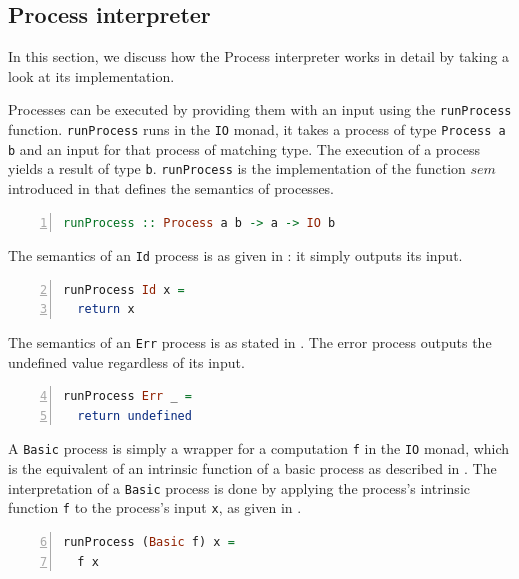\subsection{Process interpreter}
In this section, we discuss how the Process interpreter works in detail by taking a look at its implementation.

Processes can be executed by providing them with an input using the \texttt{runProcess} function. \texttt{runProcess} runs in the \texttt{IO} monad, it takes a process of type \texttt{Process a b} and an input for that process of matching type. The execution of a process yields a result of type \texttt{b}. \texttt{runProcess} is the implementation of the function $sem$ introduced in  that defines the semantics of processes.
\begin{lstlisting}[language=Haskell,caption=Signature of the process interpreter implemented using \textsf{Concurrent Haskell}.,label=lst:local_runprocess_signature,numbers=left,frame=bt]
runProcess :: Process a b -> a -> IO b
\end{lstlisting}

The semantics of an \texttt{Id} process is as given in : it simply outputs its input.
\begin{lstlisting}[language=Haskell,caption=Implementation of the interpreter for \texttt{Id} processes.,label=lst:local_runprocess_const,numbers=left,frame=bt,firstnumber=2]
runProcess Id x =
  return x
\end{lstlisting}

The semantics of an \texttt{Err} process is as stated in . The error process outputs the undefined value regardless of its input.
\begin{lstlisting}[language=Haskell,caption=Implementation of the interpreter for \texttt{Err} processes.,label=lst:local_runprocess_const,numbers=left,frame=bt,firstnumber=4]
runProcess Err _ =
  return undefined
\end{lstlisting}

A \texttt{Basic} process is simply a wrapper for a computation \texttt{f} in the \texttt{IO} monad, which is the equivalent of an intrinsic function of a basic process as described in . The interpretation of a \texttt{Basic} process is done by applying the process's intrinsic function \texttt{f} to the process's input \texttt{x}, as given in .
\begin{lstlisting}[language=Haskell,caption=Implementation of the interpreter for \texttt{Basic} processes.,label=lst:local_runprocess_simple,numbers=left,frame=bt,firstnumber=6]
runProcess (Basic f) x =
  f x
\end{lstlisting}

